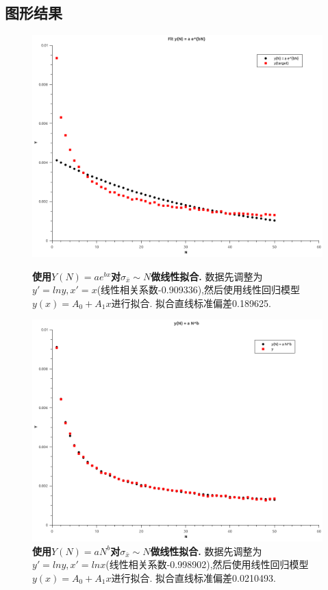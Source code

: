 \documentclass[10pt,a4paper]{article}
\begin{document}
\subsection{图形结果}
\begin{figure}[H]
\begin{minipage}[b]{0.5\linewidth}
\centering
\includegraphics[width=\textwidth]{../result/Graph1.png}
\caption{\textbf{使用$Y(N)=a e^{bx}$对$\sigma_{\bar{x}}\sim N$做线性拟合.} 数据先调整为$y'=lny,x'=x$(线性相关系数-0.909336),然后使用线性回归模型$y(x)=A_0+A_1x$进行拟合. 拟合直线标准偏差0.189625.}
\label{fig:1}
\end{minipage}
\hspace{0.5cm}
\begin{minipage}[b]{0.5\linewidth}
\centering
\includegraphics[width=\textwidth]{../result/Graph2.png}
\caption{\textbf{使用$Y(N)=a N^{b}$对$\sigma_{\bar{x}}\sim N$做线性拟合.} 数据先调整为$y'=lny,x'=lnx$(线性相关系数-0.998902),然后使用线性回归模型$y(x)=A_0+A_1x$进行拟合. 拟合直线标准偏差0.0210493.}
\label{fig:2}
\end{minipage}
\end{figure}
\end{document}
